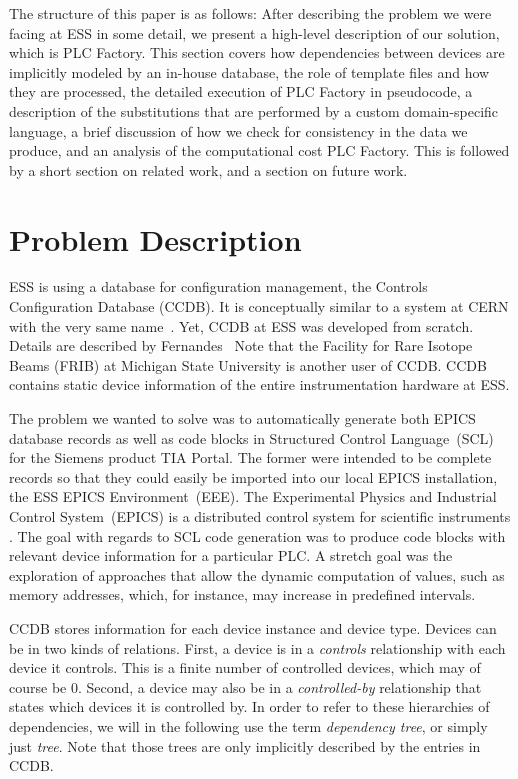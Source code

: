 \documentclass[a4paper,
              ]{jacow}
\begin{document}
The structure of this paper is as follows: After describing the problem we were facing at ESS in some detail, we present a high-level description of our solution, which is PLC Factory. This section covers how dependencies between devices are implicitly modeled by an in-house database, the role of template files and how they are processed, the detailed execution of PLC Factory in pseudocode, a description of the substitutions that are performed by a custom domain-specific language, a brief discussion of how we check for consistency in the data we produce, and an analysis of the computational cost PLC Factory. This is followed by a short section on related work, and a section on future work.



\section{Problem Description}
ESS is using a database for configuration management, the Controls Configuration Database (CCDB). It is conceptually similar to a system at CERN with the very same name~\cite{CCDB-CERN}. Yet, CCDB at ESS was developed from scratch. Details are described by Fernandes~\cite{CCDB-ESS} Note that the Facility for Rare Isotope Beams (FRIB) at Michigan State University is another user of CCDB. CCDB contains static device information of the entire instrumentation hardware at ESS.

The problem we wanted to solve was to automatically generate both EPICS database records as well as code blocks in Structured Control Language~(SCL) for the Siemens product TIA Portal. The former were intended to be complete records so that they could easily be imported into our local EPICS installation, the ESS EPICS Environment~(EEE). The Experimental Physics and Industrial Control System~(EPICS) is a distributed control system for scientific instruments \cite{EPICS}. The goal with regards to SCL code generation was to produce code blocks with relevant device information for a particular PLC. A stretch goal was the exploration of approaches that allow the dynamic computation of values, such as memory addresses, which, for instance, may increase in predefined intervals.

CCDB stores information for each device instance and device type. Devices can be in two kinds of relations. First, a device is in a \emph{controls} relationship with each device it controls. This is a finite number of controlled devices, which may of course be $0$. Second, a device may also be in a \emph{controlled-by} relationship that states which devices it is controlled by. In order to refer to these hierarchies of dependencies, we will in the following use the term \emph{dependency tree}, or simply just \emph{tree}. Note that those trees are only implicitly described by the entries in CCDB.
\end{document}
